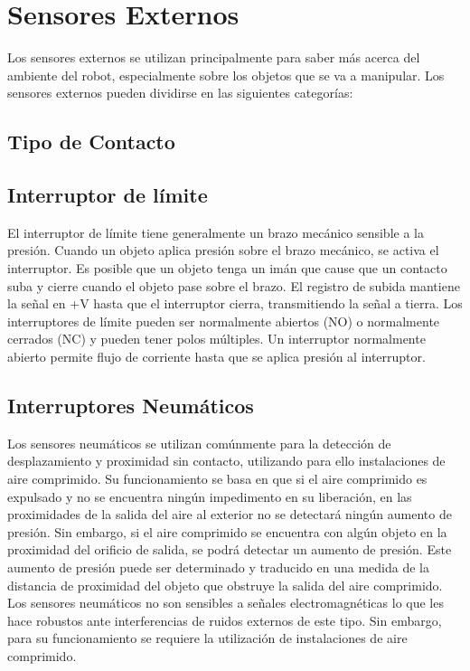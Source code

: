 \section{Sensores Externos}
Los sensores externos se utilizan principalmente para saber más acerca del ambiente del robot, especialmente sobre los objetos que se va a manipular. Los sensores externos pueden
dividirse en las siguientes categorías:

\subsection{Tipo de Contacto}

\subsection*{\quad\textbf{Interruptor de límite}}
El interruptor de límite tiene generalmente un brazo mecánico sensible a la presión. Cuando un objeto aplica presión sobre el brazo mecánico, se activa el interruptor. Es posible que un objeto tenga un imán que cause que un contacto suba y cierre cuando el objeto pase sobre el brazo. El registro de subida mantiene la señal en +V hasta que el interruptor cierra, transmitiendo la señal a tierra.\linebreak
Los interruptores de límite pueden ser normalmente abiertos (NO) o normalmente cerrados (NC) y pueden tener polos múltiples. Un interruptor normalmente abierto permite flujo de corriente hasta que se aplica presión al interruptor. 

\subsection*{\quad\textbf{Interruptores Neumáticos}}
Los sensores neumáticos se utilizan comúnmente para la detección de desplazamiento y proximidad sin contacto, utilizando para ello instalaciones de aire comprimido. Su funcionamiento se basa en que si el aire comprimido es expulsado y no se encuentra ningún impedimento en su liberación, en las proximidades de la salida del aire al exterior no se detectará ningún aumento de presión. Sin embargo, si el aire comprimido se encuentra con algún objeto en la proximidad del orificio de salida, se podrá detectar un aumento de presión. Este aumento de presión puede ser determinado y traducido en una medida de la distancia de proximidad del objeto que obstruye la salida del aire comprimido. Los sensores neumáticos no son sensibles a señales electromagnéticas lo que les hace robustos ante interferencias de ruidos externos de este tipo. Sin embargo, para su
funcionamiento se requiere la utilización de instalaciones de aire comprimido.

